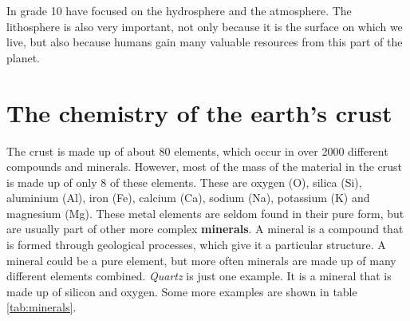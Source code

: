 

In grade 10 have focused on the hydrosphere and the atmosphere. The lithosphere is also very important, not only because it is the surface on which we live, but also because humans gain many valuable resources from this part of the planet. 






\section{The chemistry of the earth's crust}

The crust is made up of about 80 elements, which occur in over 2000 different compounds and minerals. However, most of the mass of the material in the crust is made up of only 8 of these elements. These are oxygen (O), silica (Si), aluminium (Al), iron (Fe), calcium (Ca), sodium (Na), potassium (K) and magnesium (Mg). These metal elements are seldom found in their pure form, but are usually part of other more complex \textbf{minerals}. A mineral is a compound that is formed through geological processes, which give it a particular structure. A mineral could be a pure element, but more often minerals are made up of many different elements combined. \textit{Quartz} is just one example. It is a mineral that is made up of silicon and oxygen. Some more examples are shown in table \ref{tab:minerals}. 


